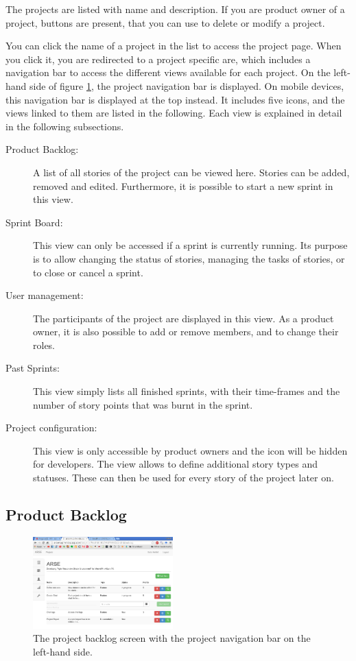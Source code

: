 \documentclass[
	accentcolor=tud1a %
]{tudreport}
\begin{document}
The projects are listed with name and description. If you are product owner of a project, buttons are present, that you can use to delete or modify a project.

You can click the name of a project in the list to access the project page. When you click it, you are redirected to a project specific are, which includes a navigation bar to access the different views available for each project. On the left-hand side of figure \ref{fig:project-backlog}, the project navigation bar is displayed. On mobile devices, this navigation bar is displayed at the top instead. It includes five icons, and the views linked to them are listed in the following. Each view is explained in detail in the following subsections.
\begin{description}
	\item[Product Backlog:] A list of all stories of the project can be viewed here. Stories can be added, removed and edited. Furthermore, it is possible to start a new sprint in this view.
	\item[Sprint Board:] This view can only be accessed if a sprint is currently running. Its purpose is to allow changing the status of stories, managing the tasks of stories, or to close or cancel a sprint.
	\item[User management:] The participants of the project are displayed in this view. As a product owner, it is also possible to add or remove members, and to change their roles.
	\item[Past Sprints:] This view simply lists all finished sprints, with their time-frames and the number of story points that was burnt in the sprint.
	\item[Project configuration:] This view is only accessible by product owners and the icon will be hidden for developers. The view allows to define additional story types and statuses. These can then be used for every story of the project later on.
\end{description}


\subsection{Product Backlog}
\label{sec:backlog}


\begin{figure}
	\centering
	\includegraphics[width=0.48\textwidth]{img/backlog}
	\caption{The project backlog screen with the project navigation bar on the left-hand side.}
	\label{fig:project-backlog}
\end{figure}
\end{document}
